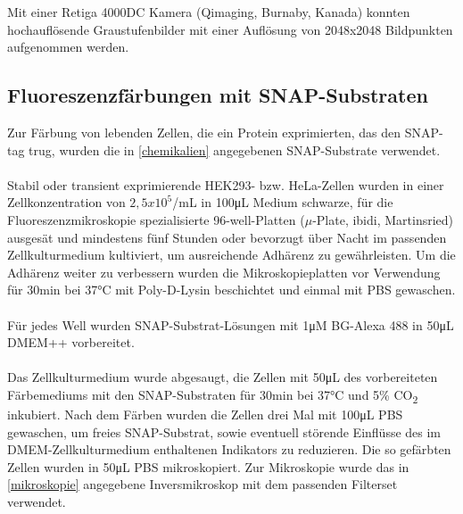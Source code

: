  Mit einer Retiga 4000DC Kamera (Qimaging, Burnaby, Kanada) konnten hochauflösende Graustufenbilder mit einer Auflösung von 2048x2048 Bildpunkten aufgenommen werden.  

\subsection{Fluoreszenzfärbungen mit SNAP-Substraten}

Zur Färbung von lebenden Zellen, die ein Protein exprimierten, das den SNAP-tag trug, wurden die in \ref{chemikalien} angegebenen SNAP-Substrate verwendet.
\\
\\
 Stabil oder transient exprimierende HEK293- bzw. HeLa-Zellen wurden in einer Zellkonzentration von $2,5x10^5$/\si{\milli\liter} in 100\si{\micro\liter} Medium schwarze, für die Fluoreszenzmikroskopie spezialisierte 96-well-Platten ($\mu$-Plate, ibidi, Martinsried) ausgesät und mindestens fünf Stunden oder bevorzugt über Nacht im passenden Zellkulturmedium kultiviert, um ausreichende Adhärenz zu gewährleisten. Um die Adhärenz weiter zu verbessern wurden die Mikroskopieplatten vor Verwendung für 30\si{\minute} bei 37\si{\celsius} mit Poly-D-Lysin beschichtet und einmal mit PBS gewaschen.
\\ \\
 Für jedes Well wurden SNAP-Substrat-Lösungen mit 1\si{\micro M} BG-Alexa 488 in 50\si{\micro\liter} DMEM++ vorbereitet.
\\ \\
Das Zellkulturmedium wurde abgesaugt, die Zellen mit 50\si{\micro\liter} des vorbereiteten Färbemediums mit den SNAP-Substraten für 30\si{\minute} bei 37\si{\celsius} und 5\% CO\textsubscript{2} inkubiert. Nach dem Färben wurden die Zellen drei Mal mit 100\si{\micro\liter} PBS gewaschen, um freies SNAP-Substrat, sowie eventuell störende Einflüsse des im DMEM-Zellkulturmedium enthaltenen Indikators zu reduzieren. Die so gefärbten Zellen wurden in 50\si{\micro\liter} PBS mikroskopiert.
Zur Mikroskopie wurde das in \ref{mikroskopie} angegebene Inversmikroskop mit dem passenden Filterset verwendet.

